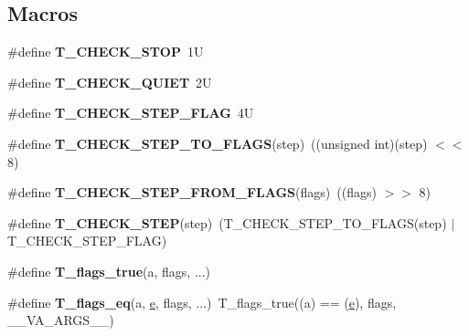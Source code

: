 \subsection*{Macros}
\begin{DoxyCompactItemize}
\item 
\mbox{\label{group__RTEMSTestFrameworkImpl_gab1b61400c794eef6d3316e92bbe99b61}} 
\#define {\bfseries T\+\_\+\+C\+H\+E\+C\+K\+\_\+\+S\+T\+OP}~1U
\item 
\mbox{\label{group__RTEMSTestFrameworkImpl_ga3f7192b5061549e8f59457814b376889}} 
\#define {\bfseries T\+\_\+\+C\+H\+E\+C\+K\+\_\+\+Q\+U\+I\+ET}~2U
\item 
\mbox{\label{group__RTEMSTestFrameworkImpl_gac8187f5d5b5e47c86e583ea962bf0d85}} 
\#define {\bfseries T\+\_\+\+C\+H\+E\+C\+K\+\_\+\+S\+T\+E\+P\+\_\+\+F\+L\+AG}~4U
\item 
\mbox{\label{group__RTEMSTestFrameworkImpl_ga6fa32d59f91a2dcb360edded621ac8de}} 
\#define {\bfseries T\+\_\+\+C\+H\+E\+C\+K\+\_\+\+S\+T\+E\+P\+\_\+\+T\+O\+\_\+\+F\+L\+A\+GS}(step)~((unsigned int)(step) $<$$<$ 8)
\item 
\mbox{\label{group__RTEMSTestFrameworkImpl_ga3b3d9c6c9802d92170462f3135526510}} 
\#define {\bfseries T\+\_\+\+C\+H\+E\+C\+K\+\_\+\+S\+T\+E\+P\+\_\+\+F\+R\+O\+M\+\_\+\+F\+L\+A\+GS}(flags)~((flags) $>$$>$ 8)
\item 
\mbox{\label{group__RTEMSTestFrameworkImpl_ga97f5f5a475d1f6baa27bb19c35c043e5}} 
\#define {\bfseries T\+\_\+\+C\+H\+E\+C\+K\+\_\+\+S\+T\+EP}(step)~(T\+\_\+\+C\+H\+E\+C\+K\+\_\+\+S\+T\+E\+P\+\_\+\+T\+O\+\_\+\+F\+L\+A\+GS(step) $\vert$ T\+\_\+\+C\+H\+E\+C\+K\+\_\+\+S\+T\+E\+P\+\_\+\+F\+L\+AG)
\item 
\#define {\bfseries T\+\_\+flags\+\_\+true}(a,  flags, ...)
\item 
\mbox{\label{group__RTEMSTestFrameworkImpl_gac0a9c13eef9f99b614a6610101e0be98}} 
\#define {\bfseries T\+\_\+flags\+\_\+eq}(a,  \mbox{\hyperlink{sun4u_2tte_8h_a8b0b9ed08e0e18920ec2682f48228c27}{e}},  flags, ...)~T\+\_\+flags\+\_\+true((a) == (\mbox{\hyperlink{sun4u_2tte_8h_a8b0b9ed08e0e18920ec2682f48228c27}{e}}), flags, \+\_\+\+\_\+\+V\+A\+\_\+\+A\+R\+G\+S\+\_\+\+\_\+)

\end{DoxyCompactItemize}
